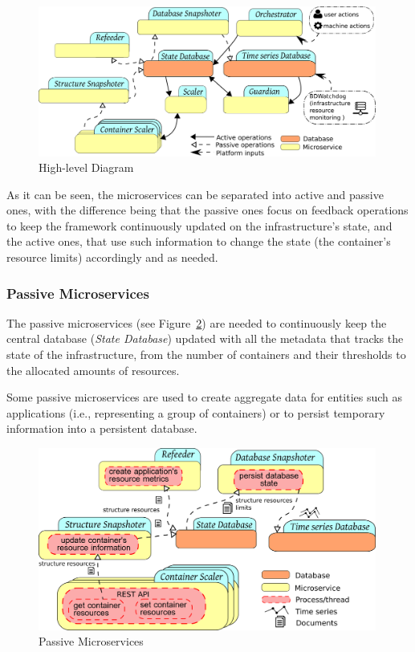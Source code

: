 \documentclass[12pt]{article}
\begin{document}
\begin{figure}[!tb]
	\centering
	\includegraphics[width=0.99\textwidth]{../img/architecture/design_diagram.png}
	\caption{High-level Diagram}
	\label{fig:HighLevelMicroserviceLayout}
\end{figure}

As it can be seen, the microservices can be separated into active and passive ones, with the difference being that the passive ones focus on feedback operations to keep the framework continuously updated on the infrastructure's state, and the active ones, that use such information to change the state (the container's resource limits) accordingly and as needed.

\subsubsection{Passive Microservices}

The passive microservices (see Figure~\ref{fig:PassiveMicroservices}) are needed to continuously keep the central database (\textit{State Database}) updated with all the metadata that tracks the state of the infrastructure, from the number of containers and their thresholds to the allocated amounts of resources.

Some passive microservices are used to create aggregate data for entities such as applications (i.e., representing a group of containers) or to persist temporary information into a persistent database.

\begin{figure}[!tb]
	\centering
	\includegraphics[width=0.99\textwidth]{../img/architecture/passive_services.png}
	\caption{Passive Microservices}
	\label{fig:PassiveMicroservices}
\end{figure}
\end{document}
